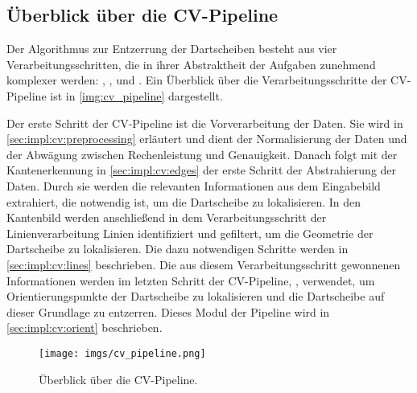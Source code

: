 
\subsection{Überblick über die CV-Pipeline}
\label{sec:impl:cv:pipeline}

Der Algorithmus zur Entzerrung der Dartscheiben besteht aus vier Verarbeitungsschritten, die in ihrer Abstraktheit der Aufgaben zunehmend komplexer werden: , ,  und . Ein Überblick über die Verarbeitungsschritte der CV-Pipeline ist in \autoref{img:cv_pipeline} dargestellt.

Der erste Schritt der CV-Pipeline ist die Vorverarbeitung der Daten. Sie wird in \autoref{sec:impl:cv:preprocessing} erläutert und dient der Normalisierung der Daten und der Abwägung zwischen Rechenleistung und Genauigkeit. Danach folgt mit der Kantenerkennung in \autoref{sec:impl:cv:edges} der erste Schritt der Abstrahierung der Daten. Durch sie werden die relevanten Informationen aus dem Eingabebild extrahiert, die notwendig ist, um die Dartscheibe zu lokalisieren. In den Kantenbild werden anschließend in dem Verarbeitungsschritt der Linienverarbeitung Linien identifiziert und gefiltert, um die Geometrie der Dartscheibe zu lokalisieren. Die dazu notwendigen Schritte werden in \autoref{sec:impl:cv:lines} beschrieben. Die aus diesem Verarbeitungsschritt gewonnenen Informationen werden im letzten Schritt der CV-Pipeline, , verwendet, um Orientierungspunkte der Dartscheibe zu lokalisieren und die Dartscheibe auf dieser Grundlage zu entzerren. Dieses Modul der Pipeline wird in \autoref{sec:impl:cv:orient} beschrieben.

\begin{figure}
    \centering
    \texttt{[image: imgs/cv\_pipeline.png]}
    \caption{Überblick über die CV-Pipeline.}
    \label{img:cv_pipeline}
\end{figure}

